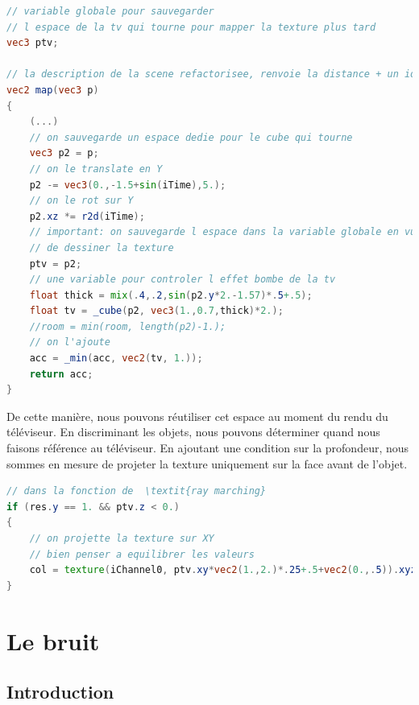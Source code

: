 \begin{minipage}{\linewidth}
\begin{lstlisting}[language=GLSL, caption=Sauvegarde de l'espace dans une variable globale,captionpos=b,frame=single]
// variable globale pour sauvegarder 
// l espace de la tv qui tourne pour mapper la texture plus tard
vec3 ptv;

// la description de la scene refactorisee, renvoie la distance + un id
vec2 map(vec3 p)
{
    (...)
    // on sauvegarde un espace dedie pour le cube qui tourne
    vec3 p2 = p;
    // on le translate en Y
    p2 -= vec3(0.,-1.5+sin(iTime),5.);
    // on le rot sur Y
    p2.xz *= r2d(iTime);
    // important: on sauvegarde l espace dans la variable globale en vue
    // de dessiner la texture
    ptv = p2;
    // une variable pour controler l effet bombe de la tv
    float thick = mix(.4,.2,sin(p2.y*2.-1.57)*.5+.5);
    float tv = _cube(p2, vec3(1.,0.7,thick)*2.);
    //room = min(room, length(p2)-1.);  
    // on l'ajoute
    acc = _min(acc, vec2(tv, 1.));
    return acc;
}
\end{lstlisting}
\end{minipage}

De cette manière, nous pouvons réutiliser cet espace au moment du rendu du téléviseur. En discriminant les objets, nous pouvons déterminer quand nous faisons référence au téléviseur. En ajoutant une condition sur la profondeur, nous sommes en mesure de projeter la texture uniquement sur la face avant de l'objet.

\begin{minipage}{\linewidth}
\begin{lstlisting}[language=GLSL, caption=Mapper des textures,captionpos=b,frame=single]
// dans la fonction de  \textit{ray marching}
if (res.y == 1. && ptv.z < 0.)
{
    // on projette la texture sur XY
    // bien penser a equilibrer les valeurs
    col = texture(iChannel0, ptv.xy*vec2(1.,2.)*.25+.5+vec2(0.,.5)).xyz;
}
\end{lstlisting}
\end{minipage}

\newpage
\section{Le bruit}



\subsection*{Introduction}

